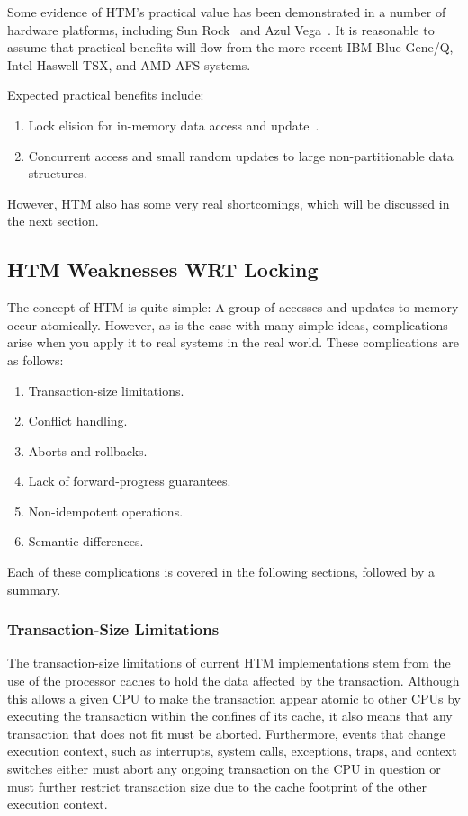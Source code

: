 Some evidence of HTM's practical value has been demonstrated in a number
of hardware platforms, including
Sun Rock~\cite{DaveDice2009ASPLOSRockHTM} and
Azul Vega~\cite{CliffClick2009AzulHTM}.
It is reasonable to assume that practical benefits will flow from the
more recent IBM Blue Gene/Q, Intel Haswell TSX, and AMD AFS systems.

Expected practical benefits include:

\begin{enumerate}
\item	Lock elision for in-memory data access and
	update~\cite{Martinez01a,Rajwar02a}.
\item	Concurrent access and small random updates to large non-partitionable
	data structures.
\end{enumerate}

However, HTM also has some very real shortcomings, which will be discussed
in the next section.

\subsection{HTM Weaknesses WRT Locking}
\label{sec:future:HTM Weaknesses WRT Locking}

The concept of HTM is quite simple: A group of accesses and updates to
memory occur atomically.
However, as is the case with many simple ideas, complications arise
when you apply it to real systems in the real world.
These complications are as follows:

\begin{enumerate}
\item	Transaction-size limitations.
\item	Conflict handling.
\item	Aborts and rollbacks.
\item	Lack of forward-progress guarantees.
\item	Non-idempotent operations.
\item	Semantic differences.
\end{enumerate}

Each of these complications is covered in the following sections,
followed by a summary.

\subsubsection{Transaction-Size Limitations}
\label{sec:future:Transaction-Size Limitations}

The transaction-size limitations of current HTM implementations
stem from the use of the processor caches to hold the data
affected by the transaction.
Although this allows a given CPU to make the transaction appear atomic to
other CPUs by executing the transaction within the confines of its cache,
it also means that any transaction that does not fit must be aborted.
Furthermore, events that change execution context, such as interrupts,
system calls, exceptions, traps, and context switches either must
abort any ongoing transaction on the CPU in question or must further
restrict transaction size due to the cache footprint of the other
execution context.


